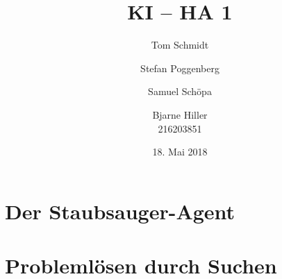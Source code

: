 \documentclass[fleqn]{scrartcl}
\author{Tom Schmidt\\ \and Stefan Poggenberg\\ \and Samuel Schöpa\\ \and Bjarne Hiller\\216203851}
\title{KI -- HA 1}
\date{18. Mai 2018}
\begin{document}
\maketitle
\section{Der Staubsauger-Agent}

\section{Problemlösen durch Suchen}
\end{document}
